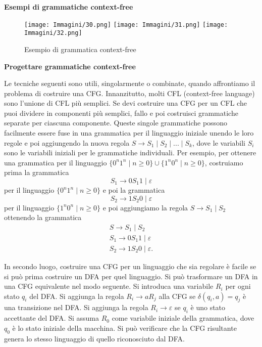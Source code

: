 \documentclass{article}
\begin{document}
\textbf{Esempi di grammatiche context-free}

\begin{figure}[H]
    \centering
    \texttt{[image: Immagini/30.png]}
    \texttt{[image: Immagini/31.png]}
    \texttt{[image: Immagini/32.png]}
    \caption{Esempio di grammatica context-free}
    \label{fig:grammar_example1}
\end{figure}

\textbf{Progettare grammatiche context-free}
\vspace{1em}

Le tecniche seguenti sono utili, singolarmente o combinate, quando affrontiamo il problema di costruire una CFG.
Innanzitutto, molti CFL (context-free language) sono l'unione di CFL più semplici. Se devi costruire una CFG per un CFL che puoi dividere in componenti più semplici, fallo e poi costruisci grammatiche separate per ciascuna componente. Queste singole grammatiche possono facilmente essere fuse in una grammatica per il linguaggio iniziale unendo le loro regole e poi aggiungendo la nuova regola $S \rightarrow S_1 \mid S_2 \mid ... \mid S_k$, dove le variabili $S_i$ sono le variabili iniziali per le grammatiche individuali.
Per esempio, per ottenere una grammatica per il linguaggio $\{0^n 1^n \mid n \geq 0\} \cup \{1^n 0^n \mid n \geq 0\}$, costruiamo prima la grammatica
$$
S_1 \rightarrow 0S_1 1 \mid \varepsilon
$$
per il linguaggio $\{0^n 1^n \mid n \geq 0\}$ e poi la grammatica
$$
S_2 \rightarrow 1S_2 0 \mid \varepsilon
$$
per il linguaggio $\{1^n 0^n \mid n \geq 0\}$ e poi aggiungiamo la regola $S \rightarrow S_1 \mid S_2$ ottenendo la grammatica
\begin{align*}
    S \rightarrow S_1 \mid S_2 \\
    S_1 \rightarrow 0S_1 1 \mid \varepsilon \\
    S_2 \rightarrow 1S_2 0 \mid \varepsilon.
\end{align*}

In secondo luogo, costruire una CFG per un linguaggio che sia regolare è facile se si può prima costruire un DFA per quel linguaggio. 
Si può trasformare un DFA in una CFG equivalente nel modo seguente. Si introduca una variabile $R_i$ per ogni stato $q_i$ del DFA. 
Si aggiunga la regola $R_i \rightarrow aR_j$ alla CFG se $\delta(q_i,a) = q_j$ è una transizione nel DFA. 
Si aggiunga la regola $R_i \rightarrow \varepsilon$ se $q_i$ è uno stato accettante del DFA. Si assuma $R_0$ come variabile iniziale della grammatica, dove $q_0$ è lo stato iniziale della macchina. 
Si può verificare che la CFG risultante genera lo stesso linguaggio di quello riconosciuto dal DFA.
\vspace{2em}
\end{document}
